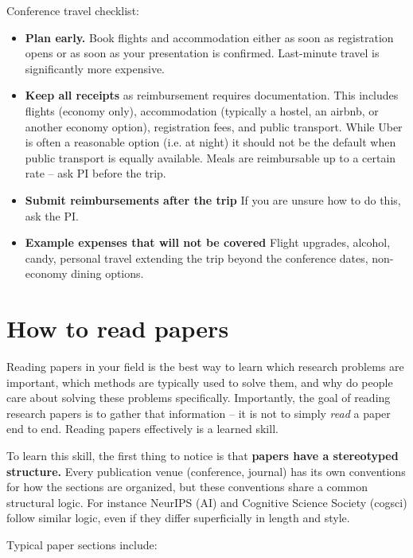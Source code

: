 \documentclass[11pt, letterpaper]{article}
\begin{document}
Conference travel checklist:

\begin{itemize}
\item \textbf{Plan early.} Book flights and accommodation either as soon as 
registration opens or as soon as your presentation is confirmed. Last-minute travel is significantly more expensive.
\item \textbf{Keep all receipts} as reimbursement requires documentation. This includes flights (economy only), accommodation (typically a hostel, an airbnb, or another economy option), registration fees, and public transport. While Uber is often a reasonable option (i.e. at night) it should not be the default when public transport is equally available. Meals are reimbursable up to a certain rate -- ask PI before the trip. 
\item \textbf{Submit reimbursements after the trip} If you are unsure how to do this, ask the PI.
\item \textbf{Example expenses that will not be covered} Flight upgrades, alcohol, candy, personal travel extending the trip beyond the conference dates, non-economy dining options.
\end{itemize}


\section{How to read papers}

Reading papers in your field is the best way to learn which research problems are important,  which methods are typically used to solve them, and why do people care about solving these problems specifically. Importantly, the goal of reading research papers is to gather that information -- it is not to simply \textit{read} a paper end to end. Reading papers effectively is a learned skill.

To learn this skill, the first thing to notice is that \textbf{ papers have a stereotyped structure.} Every publication venue (conference, journal) has its own conventions for how the sections are organized, but these conventions share a common structural logic. For instance NeurIPS (AI) and Cognitive Science Society (cogsci) follow similar logic, even if they differ superficially in length and style.

Typical paper sections include:
\end{document}
